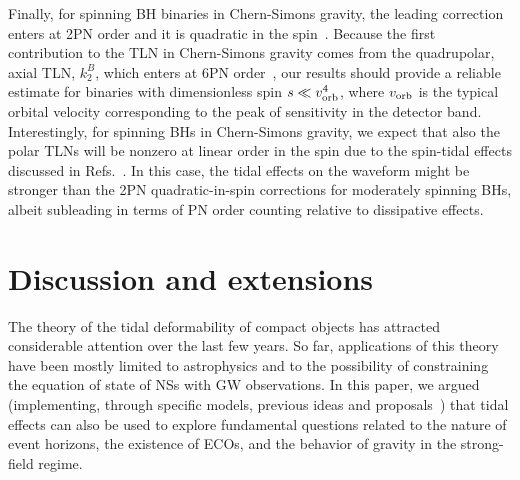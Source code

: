 \documentclass[aps,twocolumn,showpacs,preprintnumbers,nofootinbib,prd,superscriptaddress,groupedaddress,10pt]{revtex4-1}
\begin{document}
Finally, for spinning BH binaries in Chern-Simons gravity, the leading correction enters at 2PN order and it is quadratic in the spin~\cite{Yagi:2011xp}. Because the first contribution to the TLN in Chern-Simons gravity comes from the quadrupolar, axial TLN, $k^B_2$, which enters at 6PN order~\cite{Yagi:2013sva}, our results should provide a reliable estimate for binaries with dimensionless spin $s\ll v_{\rm orb}^4$, where $v_{\rm orb}$ is the typical orbital velocity corresponding to the peak of sensitivity in the detector band.
Interestingly, for spinning BHs in Chern-Simons gravity, we expect that also the polar TLNs will be nonzero at linear order in the spin due to the spin-tidal effects discussed in Refs.~\cite{Poisson:2014gka,Pani:2015hfa,Landry:2015zfa,Pani:2015nua}. In this case, the tidal effects on the waveform might be stronger than the 2PN quadratic-in-spin corrections for moderately spinning BHs, albeit subleading in terms of PN order counting relative to dissipative effects.


\section{Discussion and extensions} \label{sec:conclusion}
The theory of the tidal deformability of compact objects has attracted considerable attention over the last few years. So far, applications of this theory have been mostly limited to astrophysics and to the possibility of constraining the equation of state of NSs with GW observations.
%
In this paper, we argued (implementing, through specific models, previous ideas and proposals~\cite{Porto:2016pyg,Porto:2016zng,Rothstein:simons}) that tidal effects can also be used to explore fundamental questions related to the nature of event horizons, the existence of ECOs, and the behavior of gravity in the strong-field regime.
\end{document}
